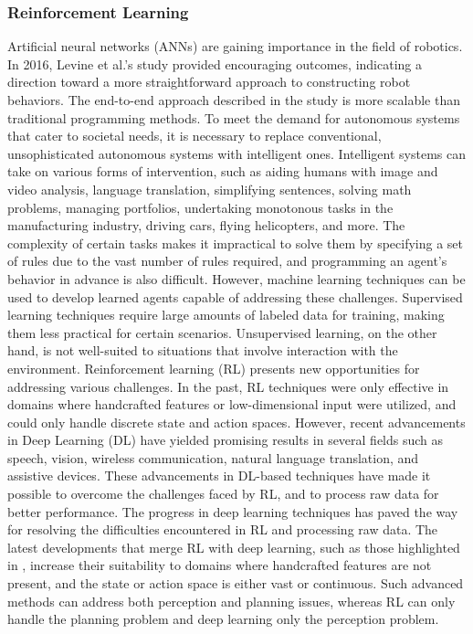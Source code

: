 \documentclass[12pt,oneside]{article}
\begin{document}
\subsubsection{Reinforcement Learning}
Artificial neural networks (ANNs) are gaining importance in the field of robotics. In 2016, Levine et al.'s study \cite{24_ball2017comprehensive} provided encouraging outcomes, indicating a direction toward a more straightforward approach to constructing robot behaviors. The end-to-end approach described in the study is more scalable than traditional programming methods. To meet the demand for autonomous systems that cater to societal needs, it is necessary to replace conventional, unsophisticated autonomous systems with intelligent ones. Intelligent systems can take on various forms of intervention, such as aiding humans with image and video analysis, language translation, simplifying sentences, solving math problems, managing portfolios, undertaking monotonous tasks in the manufacturing industry, driving cars, flying helicopters, and more. 
The complexity of certain tasks makes it impractical to solve them by specifying a set of rules due to the vast number of rules required, and programming an agent's behavior in advance is also difficult. However, machine learning techniques can be used to develop learned agents capable of addressing these challenges. Supervised learning techniques require large amounts of labeled data for training, making them less practical for certain scenarios. Unsupervised learning, on the other hand, is not well-suited to situations that involve interaction with the environment.
Reinforcement learning (RL) \cite{24_ball2017comprehensive} presents new opportunities for addressing various challenges. In the past, RL techniques were only effective in domains where handcrafted features or low-dimensional input were utilized, and could only handle discrete state and action spaces. However, recent advancements in Deep Learning (DL) have yielded promising results in several fields such as speech, vision, wireless communication, natural language translation, and assistive devices. These advancements in DL-based techniques have made it possible to overcome the challenges faced by RL, and to process raw data for better performance.
The progress in deep learning techniques has paved the way for resolving the difficulties encountered in RL and processing raw data. The latest developments that merge RL with deep learning, such as those highlighted in \cite{26_bonsai}, \cite{27_mnih2016asynchronous} increase their suitability to domains where handcrafted features are not present, and the state or action space is either vast or continuous. Such advanced methods can address both perception and planning issues, whereas RL can only handle the planning problem and deep learning only the perception problem.
\end{document}
